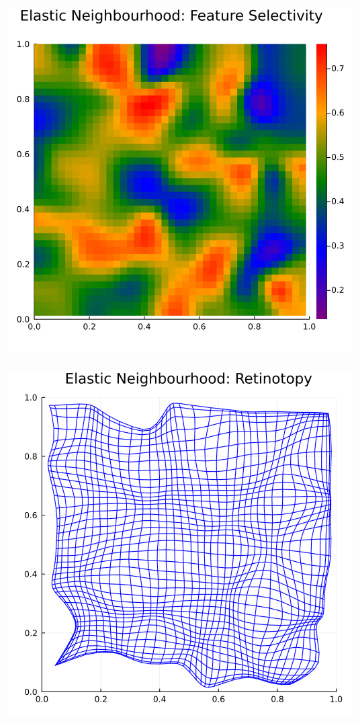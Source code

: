 \begin{figure}
\begin{subfigure}{0.5\textwidth}
		\caption{}
	\end{subfigure}
	\begin{subfigure}{0.5\textwidth}
		\centering
		\includegraphics[width=\textwidth]{images/elastic_neighbourhood/fig_elastic_neighbourhood_feature}
		\caption{}
	\end{subfigure}
	\begin{subfigure}{0.5\textwidth}
		\centering
		\includegraphics[width=\textwidth]{images/elastic_neighbourhood/fig_elastic_neighbourhood_retinotopy}

\end{subfigure}
\end{figure}
